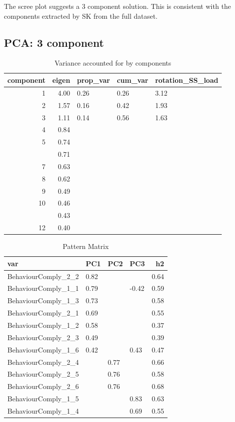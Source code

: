 \documentclass[]{article}
\begin{document}
The scree plot suggests a 3 component solution. This is consistent with
the components extracted by SK from the full dataset.

\hypertarget{pca-3-component}{%
\subsection{PCA: 3 component}\label{pca-3-component}}

\begin{table}[H]

\caption{\label{tab:unnamed-chunk-16}Variance accounted for by components}
\centering
\fontsize{6}{8}\selectfont
\begin{tabular}[t]{rrlll}
\toprule
component & eigen & prop\_var & cum\_var & rotation\_SS\_load\\
\midrule
1 & 4.00 & 0.26 & 0.26 & 3.12\\
2 & 1.57 & 0.16 & 0.42 & 1.93\\
3 & 1.11 & 0.14 & 0.56 & 1.63\\
4 & 0.84 &  &  & \\
5 & 0.74 &  &  & \\
\addlinespace
6 & 0.71 &  &  & \\
7 & 0.63 &  &  & \\
8 & 0.62 &  &  & \\
9 & 0.49 &  &  & \\
10 & 0.46 &  &  & \\
\addlinespace
11 & 0.43 &  &  & \\
12 & 0.40 &  &  & \\
\bottomrule
\end{tabular}
\end{table}

\begin{table}[H]

\caption{\label{tab:unnamed-chunk-16}Pattern Matrix}
\centering
\fontsize{6}{8}\selectfont
\begin{tabular}[t]{llllr}
\toprule
var & PC1 & PC2 & PC3 & h2\\
\midrule
BehaviourComply\_2\_2 & 0.82 &  &  & 0.64\\
BehaviourComply\_1\_1 & 0.79 &  & -0.42 & 0.59\\
BehaviourComply\_1\_3 & 0.73 &  &  & 0.58\\
BehaviourComply\_2\_1 & 0.69 &  &  & 0.55\\
BehaviourComply\_1\_2 & 0.58 &  &  & 0.37\\
\addlinespace
BehaviourComply\_2\_3 & 0.49 &  &  & 0.39\\
BehaviourComply\_1\_6 & 0.42 &  & 0.43 & 0.47\\
BehaviourComply\_2\_4 &  & 0.77 &  & 0.66\\
BehaviourComply\_2\_5 &  & 0.76 &  & 0.58\\
BehaviourComply\_2\_6 &  & 0.76 &  & 0.68\\
\addlinespace
BehaviourComply\_1\_5 &  &  & 0.83 & 0.63\\
BehaviourComply\_1\_4 &  &  & 0.69 & 0.55\\
\bottomrule
\end{tabular}
\end{table}
\end{document}
